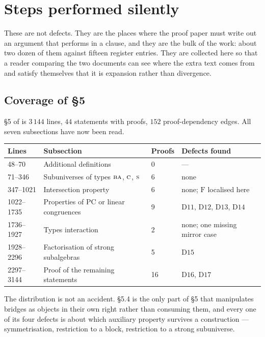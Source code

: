 \section{Steps performed silently}\label{sec:expansion}

These are not defects. They are the places where the proof paper must write out
an argument that \cite{ZhukSimplified} performs in a clause, and they are the
bulk of the work: about two dozen of them against fifteen register entries.
They are collected here so that a reader comparing the two documents can see
where the extra text comes from and satisfy themselves that it is expansion
rather than divergence.

\subsection{Coverage of \S5}\label{sec:coverage}

\S5 of \cite{ZhukSimplified} is $3\,144$ lines, $44$ statements with proofs,
$152$ proof-dependency edges. All seven subsections have now been read.

\begin{center}\small
\begin{tabular}{@{}llll@{}}
\hline
Lines & Subsection & Proofs & Defects found \\
\hline
48--70 & Additional definitions & 0 & --- \\
71--346 & Subuniverses of types $\textup{\textsc{ba}}$, $\textup{\textsc{c}}$, $\textup{\textsc{s}}$ & 6 & none \\
347--1021 & Intersection property & 6 & none; $\mathrm F$ localised here \\
1022--1735 & Properties of PC or linear congruences & 9 & $\mathrm D11$, $\mathrm D12$, $\mathrm D13$, $\mathrm D14$ \\
1736--1927 & Types interaction & 2 & none; one missing mirror case \\
1928--2296 & Factorisation of strong subalgebras & 5 & $\mathrm D15$ \\
2297--3144 & Proof of the remaining statements & 16 & $\mathrm D16$, $\mathrm D17$ \\
\hline
\end{tabular}
\end{center}

The distribution is not an accident. \S5.4 is the only part of \S5 that
manipulates bridges as objects in their own right rather than consuming them,
and every one of its four defects is about which auxiliary property survives a
construction --- symmetrisation, restriction to a block, restriction to a
strong subuniverse.

